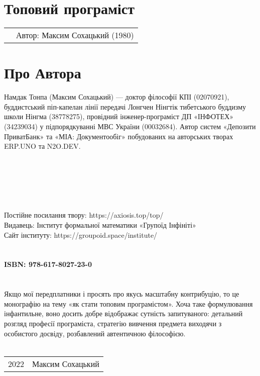 \section*{Топовий програміст \top}

\begin{tabular}{ll}
& Автор: Максим Сохацький (1980)\\
\end{tabular}

\section*{Про Автора}
Намдак Тонпа (Максим Сохацький) --- доктор філософії КПІ (02070921),
буддистський піп-капелан лінії передачі
Лонгчен Нінгтік тибетського буддизму школи Нінгма (38778275),
провідний інженер-програміст ДП «ІНФОТЕХ» (34239034)
у підпорядкуванні МВС України (00032684).
Автор систем «Депозити ПриватБанк» та «МІА: Документообіг»
побудованих на авторських творах ERP.UNO та N2O.DEV.
\\
\\
\\
\\
\\
\\
\\
Постійне посилання твору: https://axiosis.top/top/ \\
Видавець: Інститут формальної математики «Групоїд Інфініті» \\
Сайт інституту: https://groupoid.space/institute/ \\
\\
\\
{\bf ISBN: 978-617-8027-23-0 \hspace{2em}} \\
\\
\\
\indent Якщо мої передплатники і просять про якусь масштабну контрибуцію,
то це монографію на тему «як стати топовим програмістом».
Хоча таке формулювання інфантильне, воно досить добре
відображає сутність запитуваного: детальний розгляд професії
програміста, стратегію вивчення предмета виходячи з особистого
досвіду, розбавлений автентичною філософією.
\\
\\
\begin{tabular}{ll}
\textcopyright{} 2022 & Максим Сохацький
\end{tabular}
